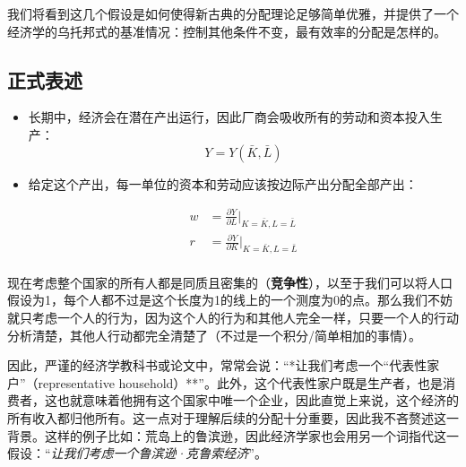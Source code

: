 \documentclass[
  11pt,
  letterpaper,
]{ctexbook}
\begin{document}
我们将看到这几个假设是如何使得新古典的分配理论足够简单优雅，并提供了一个经济学的乌托邦式的基准情况：控制其他条件不变，最有效率的分配是怎样的。

\subsection{正式表述}\label{ux6b63ux5f0fux8868ux8ff0}

\begin{itemize}
\item
  长期中，经济会在潜在产出运行，因此厂商会吸收所有的劳动和资本投入生产：
  \[
  Y = Y(\bar{K},\bar{L})
  \]
\item
  给定这个产出，每一单位的资本和劳动应该按边际产出分配全部产出：

  \begin{align}
  w &= \frac{\partial Y}{\partial L}|_{K=\bar{K},L=\bar{L}} \\

  r &= \frac{\partial Y}{\partial K}|_{K=\bar{K},L=\bar{L}} \\
  \end{align}
\end{itemize}

现在考虑整个国家的所有人都是同质且密集的（\textbf{竞争性}），以至于我们可以将人口假设为1，每个人都不过是这个长度为1的线上的一个测度为0的点。那么我们不妨就只考虑一个人的行为，因为这个人的行为和其他人完全一样，只要一个人的行动分析清楚，其他人行动都完全清楚了（不过是一个积分/简单相加的事情）。

\begin{tcolorbox}[enhanced jigsaw, colbacktitle=quarto-callout-tip-color!10!white, rightrule=.15mm, colback=white, left=2mm, coltitle=black, colframe=quarto-callout-tip-color-frame, opacityback=0, breakable, arc=.35mm, title=\textcolor{quarto-callout-tip-color}{\faLightbulb}\hspace{0.5em}{Tip}, titlerule=0mm, bottomrule=.15mm, opacitybacktitle=0.6, bottomtitle=1mm, toprule=.15mm, toptitle=1mm, leftrule=.75mm]

因此，严谨的经济学教科书或论文中，常常会说：``*让我们考虑一个``代表性家户''（representative
household）**''。此外，这个代表性家户既是生产者，也是消费者，这也就意味着他拥有这个国家中唯一个企业，因此直觉上来说，这个经济的所有收入都归他所有。这一点对于理解后续的分配十分重要，因此我不吝赘述这一背景。这样的例子比如：荒岛上的鲁滨逊，因此经济学家也会用另一个词指代这一假设：``\emph{让我们考虑一个鲁滨逊·克鲁索经济}''。

\end{tcolorbox}
\end{document}
